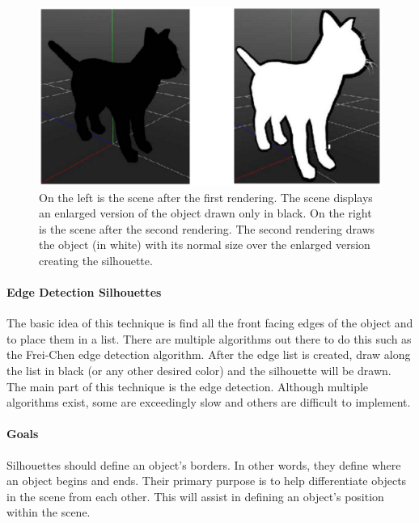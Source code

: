 \begin{figure} [H]
  \includegraphics[scale=0.5]{techreview_v1/four.eps}
  \caption
{ \newline \hspace{\linewidth}
On the left is the scene after the first rendering. The scene displays an enlarged version of the object drawn only in black. On the right is the scene after the second rendering. The second rendering draws the object (in white) with its normal size over the enlarged version creating the silhouette.}
  \label{fig:four}
\end{figure}

\paragraph{Edge Detection Silhouettes}
The basic idea of this technique is find all the front facing edges of the object and to place them in a list.
There are multiple algorithms out there to do this such as the Frei-Chen edge detection algorithm. \cite{edgedetector}
After the edge list is created, draw along the list in black (or any other desired color) and the silhouette will be drawn. \cite{toonshading}
The main part of this technique is the edge detection. 
Although multiple algorithms exist, some are exceedingly slow and others are difficult to implement.

\paragraph{Goals}
Silhouettes should define an object's borders. 
In other words, they define where an object begins and ends.
Their primary purpose is to help differentiate objects in the scene from each other.
This will assist in defining an object's position within the scene.

